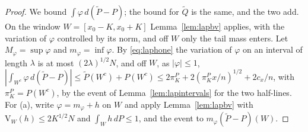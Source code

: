 \begin{proof}
We bound $\int\varphi\,d(\tilde P-P)$; the bound for $\tilde Q$ is the same, and the two add. On the window
$W=[x_0-K,x_0+K]$ Lemma~\ref{lem:lapbv} applies, with the variation of $\varphi$ controlled by its norm, and off $W$ only
the tail mass enters. Let $M_\varphi=\sup\varphi$ and $m_\varphi=\inf\varphi$. By \eqref{eq:laphone} the variation of $\varphi$ on
an interval of length $\lambda$ is at most $(2\lambda)^{1/2}N$, and off $W$, as $|\varphi|\le1$,
$|\int_{W^c}\varphi\,d(\tilde P-P)|\le\tilde P(W^c)+P(W^c)\le2\pi^P_K+2(\pi^P_Kx/n)^{1/2}+2c_x/n$, with
$\pi^P_K=P(W^c)$, by the event of Lemma~\ref{lem:lapintervals} for the two half-lines. For (a), write $\varphi=m_\varphi+h$ on $W$ and apply
Lemma~\ref{lem:lapbv} with $\mathrm V_W(h)\le2K^{1/2}N$ and $\int_Wh\,dP\le1$, and the event to $m_\varphi(\tilde P-P)(W)$.


\end{proof}
